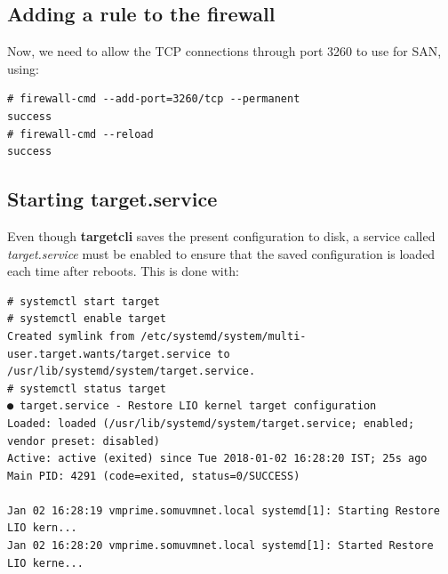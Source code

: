 \subsection{Adding a rule to the firewall}
Now, we need to allow the TCP connections through port 3260 to use for SAN, using:

\vspace{-15pt}
\begin{verbatim}
# firewall-cmd --add-port=3260/tcp --permanent 
success
# firewall-cmd --reload
success
\end{verbatim}
\vspace{-10pt}

\subsection{Starting target.service}
Even though \textbf{targetcli} saves the present configuration to disk, a service called \textit{target.service} must be enabled to ensure that the saved configuration is loaded each time after reboots. This is done with:

\vspace{-15pt}
\begin{verbatim}
# systemctl start target
# systemctl enable target
Created symlink from /etc/systemd/system/multi-user.target.wants/target.service to /usr/lib/systemd/system/target.service.
# systemctl status target
● target.service - Restore LIO kernel target configuration
Loaded: loaded (/usr/lib/systemd/system/target.service; enabled; vendor preset: disabled)
Active: active (exited) since Tue 2018-01-02 16:28:20 IST; 25s ago
Main PID: 4291 (code=exited, status=0/SUCCESS)

Jan 02 16:28:19 vmprime.somuvmnet.local systemd[1]: Starting Restore LIO kern...
Jan 02 16:28:20 vmprime.somuvmnet.local systemd[1]: Started Restore LIO kerne...
\end{verbatim}
\vspace{-10pt}	